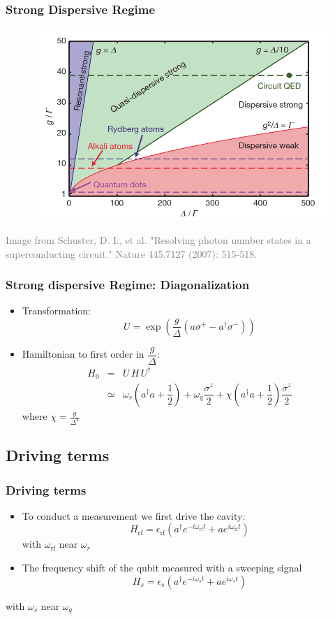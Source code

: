 \documentclass[xcolor=dvipsnames,hyperref={CJKbookmarks=true}]{beamer}
\newcommand{\rf}{\text{rf}}
\begin{document}
\begin{frame}
\frametitle{Strong Dispersive Regime}
\begin{figure}
\centering
\includegraphics[width=.9\textwidth]{Regime}
\end{figure}
\begin{center}
\tiny{\textcolor{gray}{Image from Schuster, D. I., et al. "Resolving photon number states in a superconducting circuit." Nature 445.7127 (2007): 515-518.\cite{schuster2007resolving}}}
\end{center}
\end{frame}

\begin{frame}
\frametitle{Strong dispersive Regime: Diagonalization}
\begin{itemize}
\item Transformation: 
$$U=\exp{\left(\dfrac{g}{\Delta}\left(a\sigma^{+}-a^{\dagger}\sigma^{-} \right)\right)}$$
\item Hamiltonian to first order in $\dfrac{g}{\Delta}$:
\begin{eqnarray*}
H_0 &=& U\,H\,U^{\dagger}\\
&\simeq &  \omega_r \left(a^{\dagger} a+ \dfrac{1}{2} \right) +  \omega_q \dfrac{\sigma^{z}}{2}+ \chi \left(a^{\dagger}a+\dfrac{1}{2} \right)\dfrac{\sigma^{z}}{2}
\end{eqnarray*}
where $\chi = \frac{g}{\Delta ^2}$
\end{itemize}
\end{frame}

\subsection{Driving terms}
\begin{frame}
\frametitle{Driving terms}
\begin{itemize}
\item To conduct a measurement we first drive the cavity:
$$H_{\rf} = \epsilon_{\rf}\left(a^{\dagger}e^{-i\omega_{\rf}t}+ae^{i\omega_{\rf}t} \right)$$
with $\omega_{\rf}$ near $\omega_r$
\item The frequency shift of the qubit measured with a sweeping signal
$$H_{s} = \epsilon_{s}\left(a^{\dagger}e^{-i\omega_{s}t}+ae^{i\omega_{s}t} \right)$$
\end{itemize}
with $\omega_{s}$ near $\omega_{q}$
\end{frame}
\end{document}
